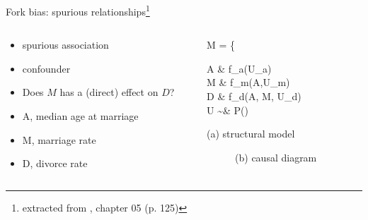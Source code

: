 \begin{frame}
	{Fork bias: spurious relationships\footnote{extracted from \citet{McElreath_2020}, chapter 05 (p. 125)}}
	\begin{columns}
		\begin{column}{0.5\textwidth}
			\begin{itemize}
				\item spurious association
				\item confounder
			\end{itemize}
			\begin{itemize}
				\item Does $M$ has a (direct) effect on $D$?
			\end{itemize}
			\begin{itemize}
				\item A, median age at marriage
				\item M, marriage rate
				\item D, divorce rate
			\end{itemize}
		\end{column}
		\begin{column}{0.5\textwidth}  
			\begin{equ}
				M = \left\{ \begin{aligned} 
					A \leftarrow & \; f_{a}(U_{a}) \\
					M \leftarrow & \; f_{m}(A,U_{m}) \\
					D \leftarrow & \; f_{d}(A, M, U_{d}) \\
					U \sim & \; P()
				\end{aligned} \right
				\caption*{(a) structural model}
			\end{equ}
			\begin{figure}
				\caption*{(b) causal diagram}
			\end{figure}
		\end{column}
	\end{columns}
\end{frame}
